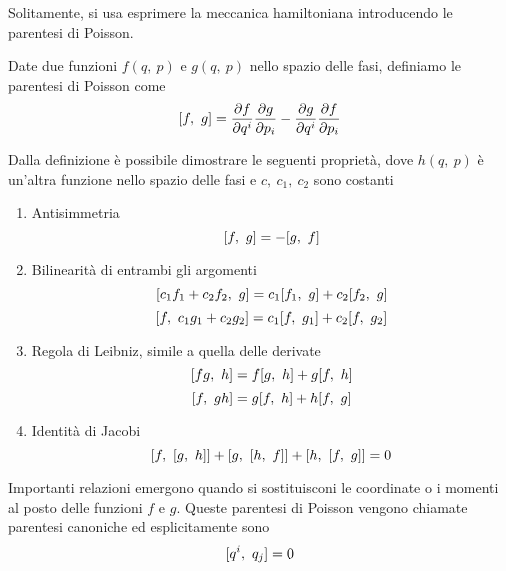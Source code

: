    Solitamente, si usa esprimere la meccanica hamiltoniana introducendo le parentesi di Poisson. 
    \begin{definition}
        Date due funzioni $f(q, ~p)$ e $g(q, ~p)$ nello spazio delle fasi, definiamo le parentesi di Poisson come
    \begin{equation} \label{poisson}
        [f, ~g] = \frac{\partial f}{\partial q^i} \frac{\partial g}{\partial p_i} - \frac{\partial g}{\partial q^i} \frac{\partial f}{\partial p_i}
    \end{equation}
    \end{definition}
    Dalla definizione è possibile dimostrare le seguenti proprietà, dove $h(q, ~p)$ è un'altra funzione nello spazio delle fasi e $c, ~c_1, ~c_2$ sono costanti
    \begin{enumerate}
        \item Antisimmetria
    \begin{equation*}
        [f, ~g] = - [g, ~f]
    \end{equation*}
        \item Bilinearità di entrambi gli argomenti
    \begin{equation*}
        [c_1f_1+c_2f_2, ~g] = c_1 [f_1, ~g] + c_2 [f_2, ~g]
    \end{equation*}
    \begin{equation*}
        [f, ~c_1g_1+c_2g_2] = c_1 [f, ~g_1] + c_2 [f, ~g_2]
    \end{equation*}
        \item Regola di Leibniz, simile a quella delle derivate
    \begin{equation*}
        [fg, ~h] = f [g, ~h] + g [f, ~h]
    \end{equation*}
    \begin{equation*}
        [f, ~gh] = g [f, ~h] + h [f, ~g]
    \end{equation*}
        \item Identità di Jacobi
    \begin{equation} \label{jacobi}
        [f, ~[g, ~h]] + [g, ~[h, ~f]] + [h, ~[f, ~g]] = 0
    \end{equation}
    \end{enumerate}
    Importanti relazioni emergono quando si sostituisconi le coordinate o i momenti al posto delle funzioni $f$ e $g$. Queste parentesi di Poisson vengono chiamate parentesi canoniche ed esplicitamente sono 
    \begin{equation} \label{canq}
        [q^i, ~q_j] = 0
    \end{equation}
